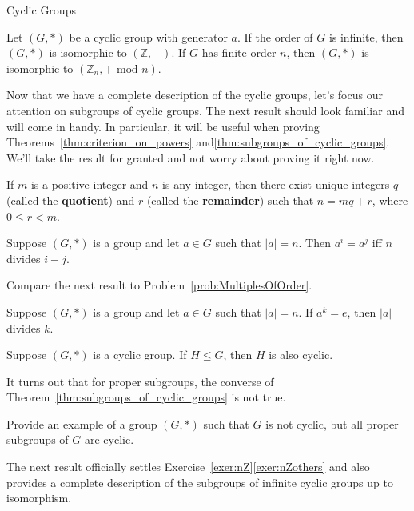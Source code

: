 \begin{section}{Cyclic Groups}
\begin{theorem}
Let $(G,*)$ be a cyclic group with generator $a$. If the order of $G$ is infinite, then $(G,*)$ is isomorphic to $(\mathbb{Z},+)$. If $G$ has finite order $n$, then $(G,*)$ is isomorphic to $(\mathbb{Z}_n,+\text{ mod }n)$.
\end{theorem}

Now that we have a complete description of the cyclic groups, let's focus our attention on subgroups of cyclic groups.  The next result should look familiar and will come in handy.  In particular, it will be useful when proving Theorems~\ref{thm:criterion_on_powers} and\ref{thm:subgroups_of_cyclic_groups}.  We'll take the result for granted and not worry about proving it right now.

\begin{theorem}
If $m$ is a positive integer and $n$ is any integer, then there exist unique integers $q$ (called the \textbf{quotient}) and $r$ (called the \textbf{remainder}) such that $n=mq+r$, where $0\leq r<m$.
\end{theorem}

\begin{theorem}\label{thm:criterion_on_powers}
Suppose $(G,*)$ is a group and let $a\in G$ such that $|a|=n$.  Then $a^i=a^j$ iff $n$ divides $i-j$.
\end{theorem}

Compare the next result to Problem~\ref{prob:MultiplesOfOrder}.

\begin{corollary}
Suppose $(G,*)$ is a group and let $a\in G$ such that $|a|=n$.  If $a^k=e$, then $|a|$ divides $k$.
\end{corollary}

\begin{theorem}\label{thm:subgroups_of_cyclic_groups}
Suppose $(G,*)$ is a cyclic group. If $H\leq G$, then $H$ is also cyclic.
\end{theorem}

It turns out that for proper subgroups, the converse of Theorem~\ref{thm:subgroups_of_cyclic_groups} is not true.

\begin{exercise}
Provide an example of a group $(G,*)$ such that $G$ is not cyclic, but all proper subgroups of $G$ are cyclic.
\end{exercise}

The next result officially settles Exercise~\ref{exer:nZ}\ref{exer:nZothers} and also provides a complete description of the subgroups of infinite cyclic groups up to isomorphism.


\end{section}
